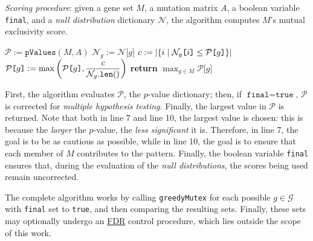 \begin{algorithm}[H]
    \caption{
        \textit{Scoring procedure}: given a gene set $M$, a mutation matrix $A$, a boolean variable \texttt{final}, and a \textit{null distribution} dictionary $\mathcal N$, the algorithm computes $M$'s mutual exclusivity score.
    }

        \label{score_mutex}
    \begin{algorithmic}[1]
            \State $\mathcal P := \texttt{pValues}(M, A)$
             
                    \State $\mathcal N_g := \mathcal N\texttt{[}g\texttt{]}$
                    \State $c := \left|\{i \mid \mathcal N_g\texttt{[}i\texttt{]} \le \mathcal P \texttt{[}g\texttt{]}\}\right|$
                    \State $\mathcal P\texttt{[}g\texttt{]} := \max\left(\mathcal P\texttt{[}g\texttt{]}, \dfrac{c}{\mathcal N_g.\texttt{len}()}\right)$
                \EndFor
            \EndIf
            \State \textbf{return} $\max_{g \in M}{\mathcal P\texttt{[}g\texttt{]}}$ 
        \EndFunction
    \end{algorithmic}
\end{algorithm}

First, the algorithm evaluates $\mathcal P$, the $p$-value dictionary; then, if $\texttt{final} = \texttt{true}$, $\mathcal P$ is corrected for \textit{multiple hypothesis testing}. Finally, the largest value in $\mathcal P$ is returned. Note that both in line 7 and line 10, the largest value is chosen: this is because the \textit{larger} the $p$-value, the \textit{less significant} it is. Therefore, in line 7, the goal is to be as cautious as possible, while in line 10, the goal is to ensure that each member of $M$ contributes to the pattern. Finally, the boolean variable \texttt{final} ensures that, during the evaluation of the \textit{null distributions}, the scores being used remain uncorrected.

The complete algorithm works by calling \texttt{greedyMutex} for each possible $g \in \mathcal G$ with \texttt{final} set to \texttt{true}, and then comparing the resulting sets. Finally, these sets may optionally undergo an \href{https://en.wikipedia.org/wiki/False_discovery_rate}{FDR} control procedure, which lies outside the scope of this work.

